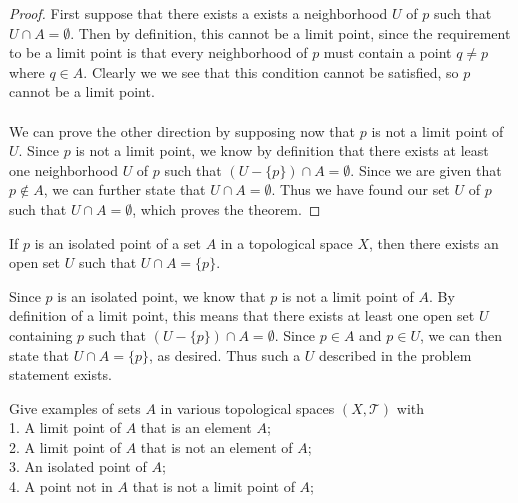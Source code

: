 \documentclass[letterpaper,12pt,twoside]{maths}
\begin{document}
\begin{proof}
    First suppose that there exists a exists a
    neighborhood $U$ of $p$ such that $U \cap A = \emptyset.$ Then by
    definition, this cannot be a limit point, since the requirement to
    be a limit point is
    that every neighborhood of $p$ must contain a point $q \ne p$
    where $q \in A$. Clearly we we see that this condition cannot be
    satisfied, so $p$ cannot be a limit point. \\
    \\
    We can prove the other direction by supposing now that $p$ is not
    a limit point of $U$. Since $p$ is not a limit point, we know by
    definition that there exists at least one neighborhood $U$ of $p$
    such that $(U - \{p\}) \cap A = \emptyset$. Since we are given
    that $p \notin A$, we can 
    further state that $U \cap A = \emptyset$. 
    Thus we have found our set $U$ of $p$
    such that $U \cap A = \emptyset$, which proves the theorem.    
\end{proof}


\begin{exercise}[Exercise 3.10]
    If $p$ is an isolated point of a set $A$ in a topological space $X$,
    then there exists an open set $U$ such that $U \cap A = \{p\}$.    
\end{exercise}

\begin{solution}
Since $p$ is an isolated point, we know that $p$ is not a limit point
of $A$. By definition of a limit point, this means that there exists
at least one open set $U$ containing $p$ such that $(U-\{p\}) \cap A =
\emptyset$. Since $p \in A$ and $p \in U$,
we can then state that $U \cap A =
\{p\}$, as desired. Thus such a $U$ described in the problem statement
exists.
\end{solution}

\begin{exercise}[Exercise 3.11]
Give examples of sets $A$ in various topological spaces $(X,
\mathscr{T})$ with\\
1. A limit point of $A$ that is an element $A$;\\
2. A limit point of $A$ that is not an element of $A$;\\
3. An isolated point of $A$;\\
4. A point not in $A$ that is not a limit point of $A$; 
\end{exercise}
\end{document}
